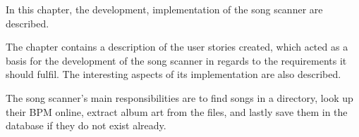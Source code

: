 In this chapter, the development, implementation of the song scanner are described. 

The chapter contains a description of the user stories created, which acted as a basis for the development of the song scanner in regards to the requirements it should fulfil. The interesting aspects of its implementation are also described. 

The song scanner's main responsibilities are to find songs in a directory, look up their BPM online, extract album art from the files, and lastly save them in the database if they do not exist already.